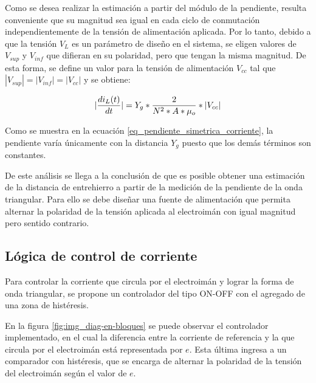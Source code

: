 Como se desea realizar la estimación a partir del módulo de la pendiente, resulta conveniente que su magnitud sea igual en cada ciclo de conmutación independientemente de la tensión de alimentación aplicada. Por lo tanto, debido a que la tensión $V_L$ es un parámetro de diseño en el sistema, se eligen valores de $V_{sup}$ y $V_{inf}$ que difieran en su polaridad, pero que tengan la misma magnitud. De esta forma, se define un valor para la tensión de alimentación $V_{cc}$ tal que $|V_{sup}|=|V_{inf}|=|V_{cc}|$ y se obtiene:
 
\begin{equation} \label{eq_pendiente_simetrica_corriente}
	\lvert\frac{di_L(t)}{dt}\rvert= Y_g*\frac{2}{N^2*A*\mu_o}*\lvert V_{cc}\rvert
\end{equation}

Como se muestra en la ecuación \ref{eq_pendiente_simetrica_corriente}, la pendiente varía únicamente con la distancia $Y_g$ puesto que los demás términos son constantes. 

De este análisis se llega a la conclusión de que es posible obtener una estimación de la distancia de entrehierro a partir de la medición de la pendiente de la onda triangular. Para ello se debe diseñar una fuente de alimentación que permita alternar la polaridad de la tensión aplicada al electroimán con igual magnitud pero sentido contrario.

\subsection{Lógica de control de corriente}

Para controlar la corriente que circula por el electroimán y lograr la forma de onda triangular, se propone un controlador del tipo ON-OFF con el agregado de una zona de histéresis.

En la figura \ref{fig:img_diag-en-bloques} se puede observar el controlador implementado, en el cual la diferencia entre la corriente de referencia y la que circula por el electroimán está representada por $e$. Esta última ingresa a un comparador con histéresis, que se encarga de alternar la polaridad de la tensión del electroimán según el valor de $e$.


